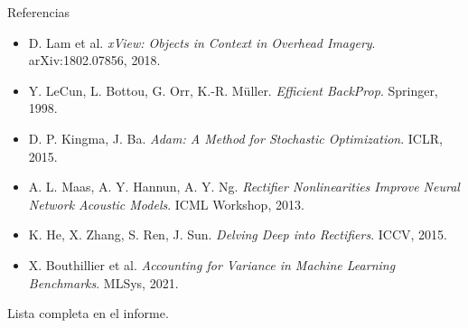\begin{frame}{Referencias}
  \footnotesize
  \begin{itemize}
    \item D. Lam et al. \emph{xView: Objects in Context in Overhead Imagery}. arXiv:1802.07856, 2018.
    \item Y. LeCun, L. Bottou, G. Orr, K.-R. Müller. \emph{Efficient BackProp}. Springer, 1998.
    \item D. P. Kingma, J. Ba. \emph{Adam: A Method for Stochastic Optimization}. ICLR, 2015.
    \item A. L. Maas, A. Y. Hannun, A. Y. Ng. \emph{Rectifier Nonlinearities Improve Neural Network Acoustic Models}. ICML Workshop, 2013.
    \item K. He, X. Zhang, S. Ren, J. Sun. \emph{Delving Deep into Rectifiers}. ICCV, 2015.
    \item X. Bouthillier et al. \emph{Accounting for Variance in Machine Learning Benchmarks}. MLSys, 2021.
  \end{itemize}
  \vspace{0.1cm}
  Lista completa en el informe.
\end{frame}
